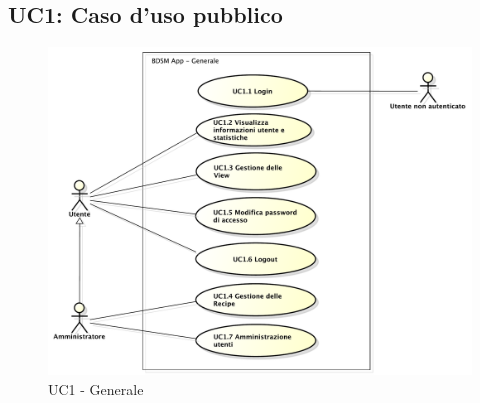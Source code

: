 \subsection{UC1: Caso d'uso pubblico}

\begin{figure}[htbp]
    \centering
    \centerline{\includegraphics[scale=0.5]{./images/UC1.pdf}}
    \caption{UC1 - Generale}
\end{figure}

